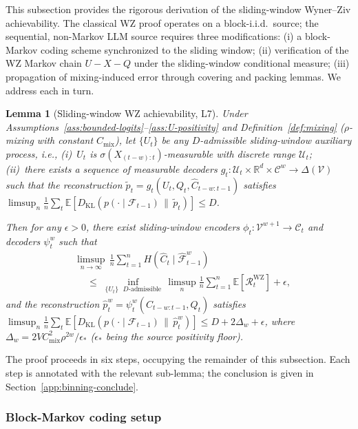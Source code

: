 \documentclass[11pt]{article}
\newcommand{\V}{\mathcal{V}}
\newcommand{\E}{\mathbb{E}}
\newcommand{\R}{\mathbb{R}}
\newcommand{\F}{\mathcal{F}}
\newcommand{\Fhat}{\hat{\F}}
\newcommand{\Chat}{\hat{C}}
\newcommand{\phat}{\hat{p}}
\newcommand{\KL}[2]{D_{\mathrm{KL}}(#1 \,\|\, #2)}
\theoremstyle{plain}
\newtheorem{lemma}[theorem]{Lemma}
\theoremstyle{definition}
\theoremstyle{remark}
\begin{document}
This subsection provides the rigorous derivation of the sliding-window
Wyner--Ziv achievability. The classical WZ proof
\citep[Sec.~11.4]{elgamal2011network} operates on a block-i.i.d.\
source; the sequential, non-Markov LLM source requires three
modifications: (i) a block-Markov coding scheme synchronized to the
sliding window; (ii) verification of the WZ Markov chain
$U - X - Q$ under the sliding-window conditional measure;
(iii) propagation of mixing-induced error through covering and
packing lemmas. We address each in turn.

\begin{lemma}[Sliding-window WZ achievability, L7]
\label{lem:binning-restricted}
Under Assumptions~\ref{ass:bounded-logits}--\ref{ass:U-positivity} and
Definition~\ref{def:mixing} ($\rho$-mixing with constant $C_{\mathrm{mix}}$),
let $\{U_t\}$ be any $D$-admissible sliding-window auxiliary process,
i.e., (i)~$U_t$ is $\sigma(X_{(t-w):t})$-measurable with discrete
range $\mathcal{U}_t$; (ii)~there exists a sequence of measurable
decoders $g_t : \mathcal{U}_t \times \R^d \times \mathcal{C}^w \to \Delta(\V)$
such that the reconstruction
$\tilde p_t = g_t(U_t, Q_t, \hat{C}_{t-w:t-1})$ satisfies
$\limsup_n \tfrac{1}{n}\sum_t \E[\KL{p(\cdot \mid \F_{t-1})}{\tilde p_t}] \leq D$.

Then for any $\epsilon > 0$, there exist sliding-window encoders
$\phi_t : \mathcal{V}^{w+1} \to \mathcal{C}_t$ and decoders
$\psi_t^w$ such that
\[
\begin{split}
&\limsup_{n \to \infty}\, \frac{1}{n}\sum_{t=1}^n H(\Chat_t \mid \Fhat_{t-1}^w)\\
&\quad\;\leq\;
\inf_{\{U_t\} \text{ } D\text{-admissible}}\,
\limsup_n \frac{1}{n}\sum_{t=1}^n \E[\mathcal{R}_t^{\mathrm{WZ}}]
+ \epsilon,
\end{split}
\]
and the reconstruction
$\phat_t^w = \psi_t^w(\Chat_{t-w:t-1}, Q_t)$ satisfies
$\limsup_n \tfrac{1}{n}\sum_t \E[\KL{p(\cdot \mid \F_{t-1})}{\phat_t^w}] \leq D + 2\Delta_w + \epsilon$,
where $\Delta_w = 2VC_{\mathrm{mix}}^2 \rho^{2w}/\epsilon_*$
($\epsilon_*$ being the source positivity floor).
\end{lemma}

The proof proceeds in six steps, occupying the remainder of this
subsection. Each step is annotated with the relevant
sub-lemma; the conclusion is given in
Section~\ref{app:binning-conclude}.

\subsubsection{Block-Markov coding setup}
\end{document}
